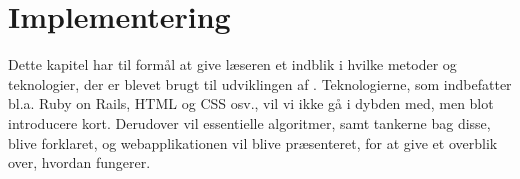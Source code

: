 \chapter{Implementering}
\label{chap:implementering}

Dette kapitel har til formål at give læseren et indblik i hvilke metoder og teknologier, der er blevet brugt til udviklingen af \Foodl. Teknologierne, som indbefatter bl.a. Ruby on Rails, HTML og CSS osv., vil vi ikke gå i dybden med, men blot introducere kort. Derudover vil essentielle algoritmer, samt tankerne bag disse, blive forklaret, og webapplikationen vil blive præsenteret, for at give et overblik over, hvordan \Foodl fungerer. 



